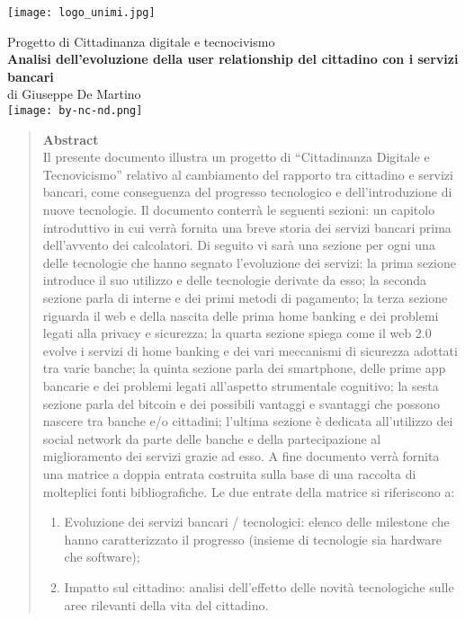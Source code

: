 \documentclass[aip, reprint]{article}
\begin{document}
\begin{titlepage}
	\centering
	\texttt{[image: logo\_unimi.jpg]} 

	Progetto di Cittadinanza digitale e tecnocivismo\\
	{\bfseries\Large
       		\textbf{ Analisi dell’evoluzione della user relationship del cittadino con i servizi bancari}\\
	}    
	di Giuseppe De Martino\\
	\vskip13cm
	\texttt{[image: by-nc-nd.png]} 
\end{titlepage}





\newpage
\tableofcontents
\newpage



\begin{quotation}
\textbf{Abstract}\\
Il presente documento illustra un progetto di “Cittadinanza Digitale e Tecnovicismo” relativo al cambiamento del rapporto tra cittadino e servizi bancari, come conseguenza del progresso tecnologico e dell’introduzione di nuove tecnologie.
Il documento conterrà le seguenti sezioni: un capitolo introduttivo in cui verrà fornita una breve storia dei servizi bancari prima dell’avvento dei calcolatori.
Di seguito vi sarà una sezione per ogni una delle tecnologie che hanno segnato l’evoluzione dei servizi: la prima sezione introduce il suo utilizzo e delle tecnologie derivate da esso; la seconda sezione parla di interne e dei primi metodi di pagamento; la terza sezione riguarda il web e della nascita delle prima home banking e dei problemi legati alla privacy e sicurezza; la quarta sezione spiega come il web 2.0 evolve i servizi di home banking e dei vari meccanismi di sicurezza adottati tra varie banche; la quinta sezione parla dei smartphone, delle prime app bancarie e dei problemi legati all’aspetto strumentale cognitivo; la sesta sezione parla del bitcoin e dei possibili vantaggi e svantaggi che possono nascere tra banche e/o cittadini; l’ultima sezione è dedicata all’utilizzo dei social network da parte delle banche e della partecipazione al miglioramento dei servizi grazie ad esso.
A fine documento verrà fornita una matrice a doppia entrata costruita sulla base di una raccolta di molteplici fonti bibliografiche.
Le due entrate della matrice si riferiscono a:
\begin{enumerate}

  \item Evoluzione dei servizi bancari / tecnologici: elenco delle milestone che hanno caratterizzato il progresso (insieme di tecnologie sia hardware che software);
  \item Impatto sul cittadino: analisi dell’effetto delle novità tecnologiche sulle aree rilevanti della vita del cittadino.


\end{enumerate}



\end{quotation}
\end{document}
